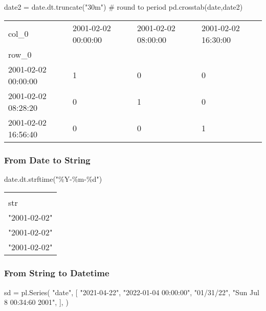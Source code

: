\documentclass[
  letterpaper,
  DIV=11,
  numbers=noendperiod]{scrartcl}
\newenvironment{Shaded}{\begin{snugshade}}{\end{snugshade}}
\newcommand{\CommentTok}[1]{\textcolor[rgb]{0.37,0.37,0.37}{#1}}
\newcommand{\NormalTok}[1]{\textcolor[rgb]{0.00,0.23,0.31}{#1}}
\newcommand{\OperatorTok}[1]{\textcolor[rgb]{0.37,0.37,0.37}{#1}}
\newcommand{\SpecialCharTok}[1]{\textcolor[rgb]{0.37,0.37,0.37}{#1}}
\newcommand{\StringTok}[1]{\textcolor[rgb]{0.13,0.47,0.30}{#1}}
\begin{document}
\begin{Shaded}
\begin{Highlighting}[]
\NormalTok{date2 }\OperatorTok{=}\NormalTok{ date.dt.truncate(}\StringTok{"30m"}\NormalTok{) }\CommentTok{\# round to period}
\NormalTok{pd.crosstab(date,date2)}
\end{Highlighting}
\end{Shaded}

\begin{longtable}[]{@{}llll@{}}
\toprule()
col\_0 & 2001-02-02 00:00:00 & 2001-02-02 08:00:00 & 2001-02-02
16:30:00 \\
row\_0 & & & \\
\midrule()
\endhead
2001-02-02 00:00:00 & 1 & 0 & 0 \\
2001-02-02 08:28:20 & 0 & 1 & 0 \\
2001-02-02 16:56:40 & 0 & 0 & 1 \\
\bottomrule()
\end{longtable}

\hypertarget{from-date-to-string}{%
\subsubsection{From Date to String}\label{from-date-to-string}}

\begin{Shaded}
\begin{Highlighting}[]
\NormalTok{date.dt.strftime(}\StringTok{"\%Y{-}\%m{-}}\SpecialCharTok{\%d}\StringTok{"}\NormalTok{)}
\end{Highlighting}
\end{Shaded}

\begin{longtable}[]{@{}l@{}}
\toprule()
 \\
str \\
\midrule()
\endhead
"2001-02-02" \\
"2001-02-02" \\
"2001-02-02" \\
\bottomrule()
\end{longtable}

\hypertarget{from-string-to-datetime}{%
\subsubsection{From String to Datetime}\label{from-string-to-datetime}}

\begin{Shaded}
\begin{Highlighting}[]
\NormalTok{sd }\OperatorTok{=}\NormalTok{ pl.Series(}
    \StringTok{"date"}\NormalTok{,}
\NormalTok{    [}
        \StringTok{"2021{-}04{-}22"}\NormalTok{,}
        \StringTok{"2022{-}01{-}04 00:00:00"}\NormalTok{,}
        \StringTok{"01/31/22"}\NormalTok{,}
        \StringTok{"Sun Jul  8 00:34:60 2001"}\NormalTok{,}
\NormalTok{    ],}
\NormalTok{)}
\end{Highlighting}
\end{Shaded}
\end{document}
